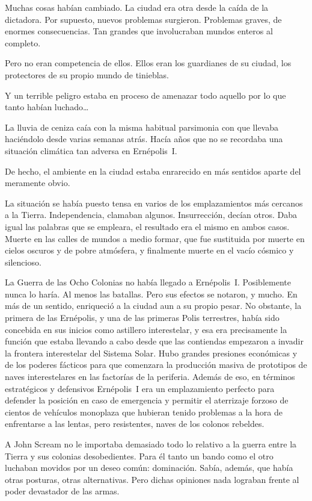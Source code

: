 \noindent
Muchas cosas habían cambiado. La ciudad era otra desde la caída de la dictadora. Por supuesto, nuevos problemas surgieron. Problemas graves, de enormes consecuencias. Tan grandes que involucraban mundos enteros al completo.

Pero no eran competencia de ellos. Ellos eran los guardianes de su ciudad, los protectores de su propio mundo de tinieblas.

Y un terrible peligro estaba en proceso de amenazar todo aquello por lo que tanto habían luchado\dots

\parbreak\noindent
La lluvia de ceniza caía con la misma habitual parsimonia con que llevaba haciéndolo desde varias semanas atrás. Hacía años que no se recordaba una situación climática tan adversa en Ernépolis~I.

De hecho, el ambiente en la ciudad estaba enrarecido en más sentidos aparte del meramente obvio.

La situación se había puesto tensa en varios de los emplazamientos más cercanos a la Tierra. Independencia, clamaban algunos. Insurrección, decían otros. Daba igual las palabras que se empleara, el resultado era el mismo en ambos casos. Muerte en las calles de mundos a medio formar, que fue sustituida por muerte en cielos oscuros y de pobre atmósfera, y finalmente muerte en el vacío cósmico y silencioso.

La Guerra de las Ocho Colonias no había llegado a Ernépolis~I. Posiblemente nunca lo haría. Al menos las batallas. Pero sus efectos se notaron, y mucho. En más de un sentido, enriqueció a la ciudad aun a su propio pesar. No obstante, la primera de las Ernépolis, y una de las primeras Polis terrestres, había sido concebida en sus inicios como astillero interestelar, y esa era precisamente la función que estaba llevando a cabo desde que las contiendas empezaron a invadir la frontera interestelar del Sistema Solar. Hubo grandes presiones económicas y de los poderes fácticos para que comenzara la producción masiva de prototipos de naves interestelares en las factorías de la periferia. Además de eso, en términos estratégicos y defensivos Ernépolis~I era un emplazamiento perfecto para defender la posición en caso de emergencia y permitir el aterrizaje forzoso de cientos de vehículos monoplaza que hubieran tenido problemas a la hora de enfrentarse a las lentas, pero resistentes, naves de los colonos rebeldes.

A John Scream no le importaba demasiado todo lo relativo a la guerra entre la Tierra y sus colonias desobedientes. Para él tanto un bando como el otro luchaban movidos por un deseo común: dominación. Sabía, además, que había otras posturas, otras alternativas. Pero dichas opiniones nada lograban frente al poder devastador de las armas.

